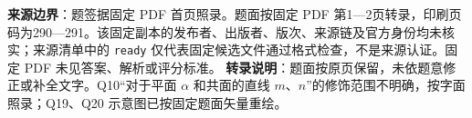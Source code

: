 

\begin{gktip}
\textbf{来源边界}：题签据固定 PDF 首页照录。题面按固定 PDF 第1—2页转录，印刷页码为290—291。该固定副本的发布者、出版者、版次、来源链及官方身份均未核实；来源清单中的 \texttt{ready} 仅代表固定候选文件通过格式检查，不是来源认证。固定 PDF 未见答案、解析或评分标准。
\textbf{转录说明}：题面按原页保留，未依题意修正或补全文字。Q10“对于平面 $\alpha$ 和共面的直线 $m\text{、}n$”的修饰范围不明确，按字面照录；Q19、Q20 示意图已按固定题面矢量重绘。
\end{gktip}


